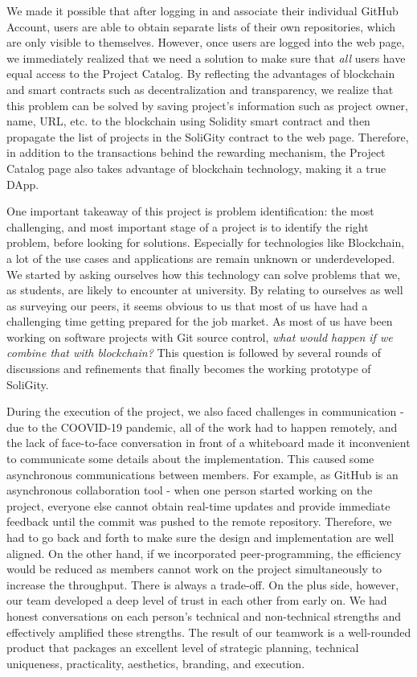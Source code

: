 \documentclass[12pt]{article}
\renewcommand{\_}{\kern-1.5pt\textunderscore\kern-1.5pt}
\begin{document}
We made it possible that after logging in and associate their individual GitHub Account, users are able to obtain separate lists of their own repositories, which are only visible to themselves. However, once users are logged into the web page, we immediately realized that we need a solution to make sure that \textit{all} users have equal access to the Project Catalog. By reflecting the advantages of blockchain and smart contracts such as decentralization and transparency, we realize that this problem can be solved by saving project's information such as project owner, name, URL, etc. to the blockchain using Solidity smart contract and then propagate the list of projects in the SoliGity contract to the web page. Therefore, in addition to the transactions behind the rewarding mechanism, the Project Catalog page also takes advantage of blockchain technology, making it a true DApp.

One important takeaway of this project is problem identification: the most challenging, and most important stage of a project is to identify the right problem, before looking for solutions. Especially for technologies like Blockchain, a lot of the use cases and applications are remain unknown or underdeveloped. We started by asking ourselves how this technology can solve problems that we, as students, are likely to encounter at university. By relating to ourselves as well as surveying our peers, it seems obvious to us that most of us have had a challenging time getting prepared for the job market. As most of us have been working on software projects with Git source control, \textit{what would happen if we combine that with blockchain?} This question is followed by several rounds of discussions and refinements that finally becomes the working prototype of SoliGity. 

During the execution of the project, we also faced challenges in communication - due to the COOVID-19 pandemic, all of the work had to happen remotely, and the lack of face-to-face conversation in front of a whiteboard made it inconvenient to communicate some details about the implementation. This caused some asynchronous communications between members. For example, as GitHub is an asynchronous collaboration tool - when one person started working on the project, everyone else cannot obtain real-time updates and provide immediate feedback until the commit was pushed to the remote repository. Therefore, we had to go back and forth to make sure the design and implementation are well aligned. On the other hand, if we incorporated peer-programming, the efficiency would be reduced as members cannot work on the project simultaneously to increase the throughput. There is always a trade-off. On the plus side, however, our team developed a deep level of trust in each other from early on. We had honest conversations on each person's technical and non-technical strengths and effectively amplified these strengths. The result of our teamwork is a well-rounded product that packages an excellent level of strategic planning, technical uniqueness, practicality, aesthetics, branding, and execution.
\end{document}
